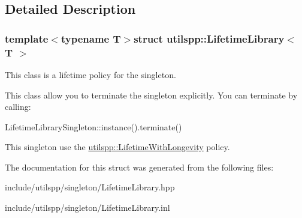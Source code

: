\subsection{Detailed Description}
\subsubsection*{template$<$typename T$>$struct utilspp\-::\-Lifetime\-Library$<$ T $>$}

This class is a lifetime policy for the singleton. 

This class allow you to terminate the singleton explicitly. You can terminate by calling\-:

Lifetime\-Library\-Singleton\-::instance().terminate()

This singleton use the \hyperlink{structutilspp_1_1LifetimeWithLongevity}{utilspp\-::\-Lifetime\-With\-Longevity} policy. 

The documentation for this struct was generated from the following files\-:\begin{DoxyCompactItemize}
\item 
include/utilspp/singleton/Lifetime\-Library.\-hpp\item 
include/utilspp/singleton/Lifetime\-Library.\-inl\end{DoxyCompactItemize}
